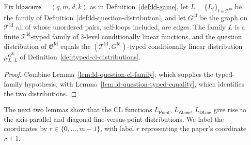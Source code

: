 \begin{lemma}\label{lem:ld-question-typed-cl}
	\leanok
	Fix $\mathsf{ldparams} = (q,m,d,k)$ as in Definition~\ref{def:ld-game}, let $L = \{L_t\}_{t \in \mathcal T^{\mathrm{ld}}}$ be the family of Definition~\ref{def:ld-question-distribution}, and let $G^{\mathrm{ld}}$ be the graph on $\mathcal T^{\mathrm{ld}}$ all of whose unordered pairs, self-loops included, are edges. The family $L$ is a finite $\mathcal T^{\mathrm{ld}}$-typed family of $3$-level conditionally linear functions, and the question distribution of $\mathfrak{G}^{\mathrm{ld}}$ equals the $(\mathcal T^{\mathrm{ld}}, G^{\mathrm{ld}})$-typed conditionally linear distribution $\mu^{G^{\mathrm{ld}}}_{L,\,L}$ of Definition~\ref{def:typed-cl-distributions}.
\end{lemma}
\begin{proof}
	\leanok
	Combine Lemma~\ref{lem:ld-question-cl-family}, which supplies the typed-family hypothesis, with Lemma~\ref{lem:ld-question-typed-equality}, which identifies the two distributions.
\end{proof}

The next two lemmas show that the CL functions $L_{\mathsf{Point}}$, $L_{\mathsf{ALine}}$, $L_{\mathsf{DLine}}$ give rise to the axis-parallel and diagonal line-versus-point distributions.
We label the coordinates by $r\in\{0,\ldots,m-1\}$, with label $r$
representing the paper's coordinate $r+1$.

